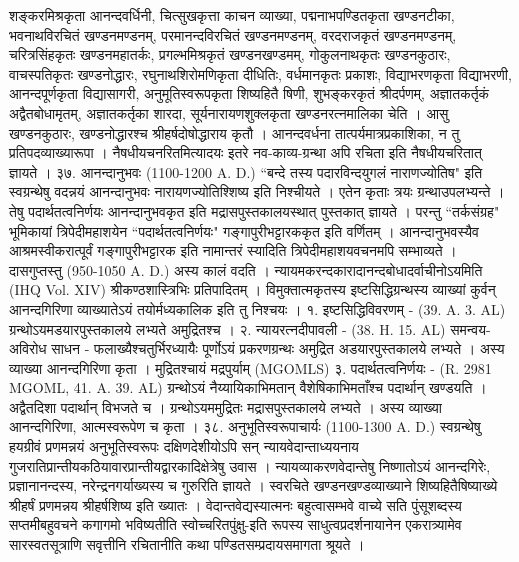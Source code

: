शङ्करमिश्रकृता आनन्दवर्धिनी, चित्सुखकृत्ता काचन व्याख्या, पद्मनाभपण्डितकृता खण्डनटीका, भवनाथविरचितं खण्डनमण्डनम्, परमानन्दविरचितं खण्डनमण्डनम्, वरदराजकृतं खण्डनमण्डनम्, चरित्रसिंहकृतः खण्डनमहातर्कः, प्रगल्भमिश्रकृतं खण्डनखण्डमम्, गोकुलनाथकृतः खण्डनकुठारः, वाचस्पतिकृतः खण्डनोद्धारः, रघुनाथशिरोमणिकृता दीधितिः, वर्धमानकृतः प्रकाशः, विद्याभरणकृता विद्याभरणी, आनन्दपूर्णकृता विद्यासागरी, अनुमूतिस्वरूपकृता शिष्यहितै षिणी, शुभङ्करकृतं श्रीदर्पणम्, अज्ञातकर्तृकं अद्वैतबोधामृतम्, अज्ञातकर्तृका शारदा, सूर्यनारायणशुक्लकृता खण्डनरत्नमालिका चेति । आसु खण्डनकुठारः, खण्डनोद्धारश्च श्रीहर्षदोषोद्धाराय कृतौ । आनन्दवर्धना तात्पर्यमात्रप्रकाशिका, न तु प्रतिपदव्याख्यारूपा ।
नैषधीयचनरितमित्यादयः इतरे नव-काव्य-ग्रन्था अपि रचिता इति नैषधीयचरितात् ज्ञायते ।
३७. आनन्दानुभवः (1100-1200 A. D.)
``बन्दे तस्य पदारविन्दयुगलं नाराणज्योतिष" इति स्वग्रन्थेषु वदन्नयं आनन्दानुभवः नारायणज्योतिश्शिष्य इति निश्चीयते । एतेन कृताः त्रयः ग्रन्थाउपलभ्यन्ते । तेषु पदार्थतत्वनिर्णयः आनन्दानुभवकृत इति मद्रासपुस्तकालयस्थात् पुस्तकात् ज्ञायते । परन्तु ``तर्कसंग्रह" भूमिकायां त्रिपेदीमहाशयेन ``पदार्थतत्वनिर्णयः" गङ्गापुरीभट्टारककृत इति वर्णितम् । आनन्दानुभवस्यैव आश्रमस्वीकरात्पूर्वं गङ्गापुरीभट्टारक इति नामान्तरं स्यादिति त्रिपेदीमहाशयवचनमपि सम्भाव्यते ।
दासगुप्तस्तु (950-1050 A. D.) अस्य कालं वदति । न्यायमकरन्दकारादानन्दबोधादर्वाचीनोऽयमिति (IHQ Vol. XIV) श्रीकण्ठशास्त्रिभिः प्रतिपादितम् । विमुक्तात्मकृतस्य इष्टसिद्धिग्रन्थस्य व्याख्यां कुर्वन् आनन्दगिरिणा व्याख्यातेऽयं तयोर्मध्यकालिक इति तु निश्चयः ।
१. इष्टसिद्धिविवरणम् - (39. A. 3. AL) ग्रन्थोऽयमडयारपुस्तकालये लभ्यते अमुद्रितश्च ।
२. न्यायरत्नदीपावली - (38. H. 15. AL)
समन्वय-अविरोध साधन - फलाख्यैश्चतुर्भिरध्यायैः पूर्णोऽयं प्रकरणग्रन्थः अमुद्रित अडयारपुस्तकालये लभ्यते । अस्य व्याख्या आनन्दगिरिणा कृता । मुद्रितश्चायं मद्रपुर्याम् (MGOMLS)
३. पदार्थतत्वनिर्णयः - (R. 2981 MGOML, 41. A. 39. AL)
ग्रन्थोऽयं नैय्यायिकाभिमतान् वैशेषिकाभिमताँश्च पदार्थान् खण्डयति । अद्वैतदिशा पदार्थान् विभजते च । ग्रन्थोऽयममुद्रितः मद्रासपुस्तकालये लभ्यते । अस्य व्याख्या आनन्दगिरिणा, आत्मस्वरूपेण च कृता ।
३८. अनुभूतिस्वरूपाचार्यः (1100-1300 A. D.)
स्वग्रन्थेषु हयग्रीवं प्रणमन्नयं अनुभूतिस्वरूपः दक्षिणदेशीयोऽपि सन् न्यायवेदान्ताध्ययनाय गुजरातिप्रान्तीयकठियावारप्रान्तीयद्वारकादिक्षेत्रेषु उवास । न्यायव्याकरणवेदान्तेषु निष्णातोऽयं आनन्दगिरेः, प्रज्ञानानन्दस्य, नरेन्द्रनगर्याख्यस्य च गुरुरिति ज्ञायते । स्वरचिते खण्डनखण्डव्याख्याने शिष्यहितैषिष्याख्ये श्रीहर्षं प्रणमन्नय श्रीहर्षशिष्य इति ख्यातः ।
वेदान्तवेद्यस्यात्मनः बहुत्वासम्भवे वाच्ये सति पुंसूशब्दस्य सप्तमीबहुवचने कगागमो भविष्यतीति स्वोच्चरितपुंक्षु-इति रूपस्य साधुत्वप्रदर्शनायानेन एकरात्र्यामेव सारस्वतसूत्राणि सवृत्तीनि रचितानीति कथा पण्डितसम्प्रदायसमागता श्रूयते ।
